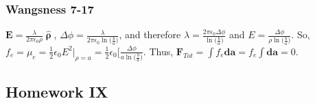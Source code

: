 \documentclass[oneside]{book}
\theoremstyle{mystyle}
\begin{document}
\subsubsection{Wangsness 7-17}
$\mathbf{E} = \frac{\lambda}{2\pi \epsilon_0 \rho}\hat{\boldsymbol{\uprho}}$, $\Delta\phi = \frac{\lambda}{2\pi \epsilon_0 \ln\big(\frac{b}{a}\big)}$, and therefore $\lambda = \frac{2\pi \epsilon_0 \Delta\phi}{\ln\big(\frac{b}{a}\big)}$ and $E = \frac{\Delta \phi}{\rho \ln\big(\frac{b}{a}\big)}$. So, $f_e = \mu_e = \frac{1}{2} \epsilon_0 E^2\bigg|_{\rho = a} = \frac{1}{2} \epsilon_0 \bigg[ \frac{\Delta\phi}{a \ln\big(\frac{b}{a}\big)}$. Thus, $\mathbf{F}_{Tot} = \int f_e \mathbf{da} = f_e \int \mathbf{da} = 0$.
\subsection{Homework IX}
\end{document}
